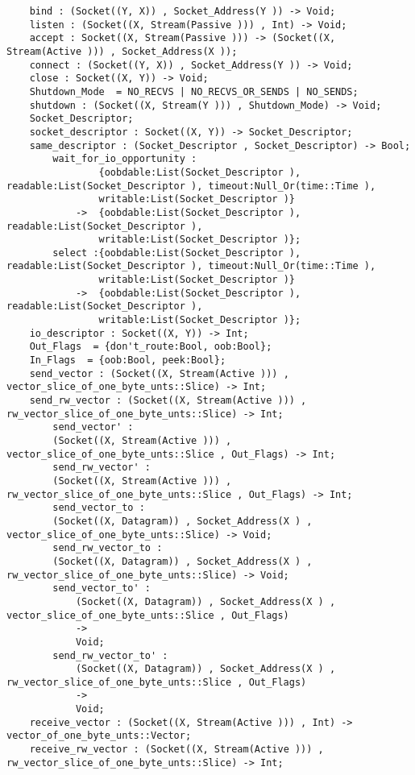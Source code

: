 \begin{verbatim}
    bind : (Socket((Y, X)) , Socket_Address(Y )) -> Void;
    listen : (Socket((X, Stream(Passive ))) , Int) -> Void;
    accept : Socket((X, Stream(Passive ))) -> (Socket((X, Stream(Active ))) , Socket_Address(X ));
    connect : (Socket((Y, X)) , Socket_Address(Y )) -> Void;
    close : Socket((X, Y)) -> Void;
    Shutdown_Mode  = NO_RECVS | NO_RECVS_OR_SENDS | NO_SENDS;
    shutdown : (Socket((X, Stream(Y ))) , Shutdown_Mode) -> Void;
    Socket_Descriptor;
    socket_descriptor : Socket((X, Y)) -> Socket_Descriptor;
    same_descriptor : (Socket_Descriptor , Socket_Descriptor) -> Bool;
        wait_for_io_opportunity :
                {oobdable:List(Socket_Descriptor ), readable:List(Socket_Descriptor ), timeout:Null_Or(time::Time ),
                writable:List(Socket_Descriptor )}
            ->  {oobdable:List(Socket_Descriptor ), readable:List(Socket_Descriptor ),
                writable:List(Socket_Descriptor )};
        select :{oobdable:List(Socket_Descriptor ), readable:List(Socket_Descriptor ), timeout:Null_Or(time::Time ),
                writable:List(Socket_Descriptor )}
            ->  {oobdable:List(Socket_Descriptor ), readable:List(Socket_Descriptor ),
                writable:List(Socket_Descriptor )};
    io_descriptor : Socket((X, Y)) -> Int;
    Out_Flags  = {don't_route:Bool, oob:Bool};
    In_Flags  = {oob:Bool, peek:Bool};
    send_vector : (Socket((X, Stream(Active ))) , vector_slice_of_one_byte_unts::Slice) -> Int;
    send_rw_vector : (Socket((X, Stream(Active ))) , rw_vector_slice_of_one_byte_unts::Slice) -> Int;
        send_vector' :
        (Socket((X, Stream(Active ))) , vector_slice_of_one_byte_unts::Slice , Out_Flags) -> Int;
        send_rw_vector' :
        (Socket((X, Stream(Active ))) , rw_vector_slice_of_one_byte_unts::Slice , Out_Flags) -> Int;
        send_vector_to :
        (Socket((X, Datagram)) , Socket_Address(X ) , vector_slice_of_one_byte_unts::Slice) -> Void;
        send_rw_vector_to :
        (Socket((X, Datagram)) , Socket_Address(X ) , rw_vector_slice_of_one_byte_unts::Slice) -> Void;
        send_vector_to' :
            (Socket((X, Datagram)) , Socket_Address(X ) , vector_slice_of_one_byte_unts::Slice , Out_Flags)
            ->
            Void;
        send_rw_vector_to' :
            (Socket((X, Datagram)) , Socket_Address(X ) , rw_vector_slice_of_one_byte_unts::Slice , Out_Flags)
            ->
            Void;
    receive_vector : (Socket((X, Stream(Active ))) , Int) -> vector_of_one_byte_unts::Vector;
    receive_rw_vector : (Socket((X, Stream(Active ))) , rw_vector_slice_of_one_byte_unts::Slice) -> Int;

\end{verbatim}
